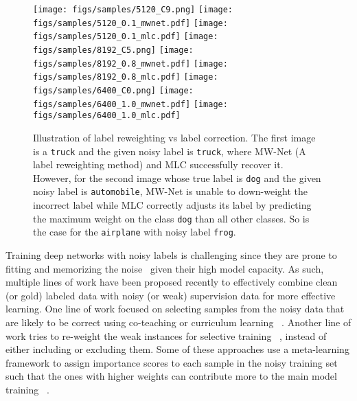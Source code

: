 \begin{figure}[t]
  \centering
  \texttt{[image: figs/samples/5120\_C9.png]}
  \texttt{[image: figs/samples/5120\_0.1\_mwnet.pdf]}
  \texttt{[image: figs/samples/5120\_0.1\_mlc.pdf]}
  \texttt{[image: figs/samples/8192\_C5.png]}
  \texttt{[image: figs/samples/8192\_0.8\_mwnet.pdf]}
  \texttt{[image: figs/samples/8192\_0.8\_mlc.pdf]}
  \texttt{[image: figs/samples/6400\_C0.png]}
  \texttt{[image: figs/samples/6400\_1.0\_mwnet.pdf]}
  \texttt{[image: figs/samples/6400\_1.0\_mlc.pdf]}
  \caption{Illustration of label reweighting vs label correction. The first image is a \texttt{truck} and the given noisy label is \texttt{truck}, where MW-Net (A label reweighting method) and MLC successfully recover it. However, for the second image whose true label is \texttt{dog} and the given noisy label is \texttt{automobile}, MW-Net is unable to down-weight the incorrect label while MLC correctly adjusts its label by predicting the maximum weight on the class \texttt{dog} than all other classes. So is the case for the \texttt{airplane}  with noisy label \texttt{frog}.}
  \label{fig:demo}
    \vspace{-0.2in}
  \end{figure}


Training deep networks with noisy labels is challenging since they are prone to fitting and memorizing the noise~\cite{zhang2016understanding} given their high model capacity. As such, multiple lines of work have
been proposed recently to effectively combine clean (or gold) labeled
data with noisy (or weak) supervision data for more effective learning. One
line of work focused on selecting samples from the noisy data that are
likely to be correct using co-teaching or curriculum learning
~\cite{jiang2017mentornet,han2018co}. Another line of work tries to re-weight the weak instances for selective training ~\cite{ren2018learning,shu2019meta}, instead of either including or excluding them. Some of these approaches use a meta-learning framework to assign importance scores to each sample in the noisy training set such that the ones with higher weights can contribute more to the main model training ~\cite{ren2018learning,shu2019meta}.



